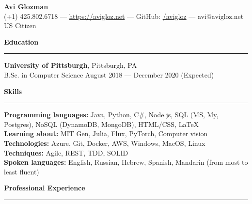 \documentclass[11pt]{article}
\begin{document}
	\pagestyle{empty}
	\begin{center}
		{\LARGE \textbf{Avi Glozman}}\\
		\vspace{2mm}
		{\large (+1) 425.802.6718 --- \href{https://avigloz.net}{https://avigloz.net} --- GitHub: \href{https://github.com/avigloz}{/avigloz} --- avi@avigloz.net}\\
		\vspace{2mm}
		US Citizen
	\end{center}
	
        \begin{flushleft}

		\vspace{-1.75mm}
		{\large \raggedright \textbf{Education}}
		\vspace{1.5mm}
	
		\hrule
	
		\vspace{2.5mm}
		\textbf{University of Pittsburgh}, Pittsburgh, PA\\
		{\small B.Sc. in Computer Science \hfill August 2018 --- December 2020 (Expected)}
	
		\vspace{1.75mm}
		{\large \raggedright \textbf{Skills}}
		\vspace{1.5mm}
	
		\hrule
	
		\vspace{2.5mm}
		\textbf{Programming languages:} Java, Python, C\#, Node.js, SQL (MS, My, Postgres), NoSQL (DynamoDB, MongoDB), HTML/CSS, \LaTeX\\
		\textbf{Learning about:} MIT Gen, Julia, Flux, PyTorch, Computer vision\\
		\textbf{Technologies:} Azure, Git, Docker, AWS, Windows, MacOS, Linux\\
		\textbf{Techniques:} Agile, REST, TDD, SOLID\\
		\textbf{Spoken languages:} English, Russian, Hebrew, Spanish, Mandarin (from most to least fluent)
		
		\vspace{1.75mm}
		{\large \raggedright \textbf{Professional Experience}}
		\vspace{1.5mm}
	
		\hrule
	

\end{flushleft}
\end{document}

